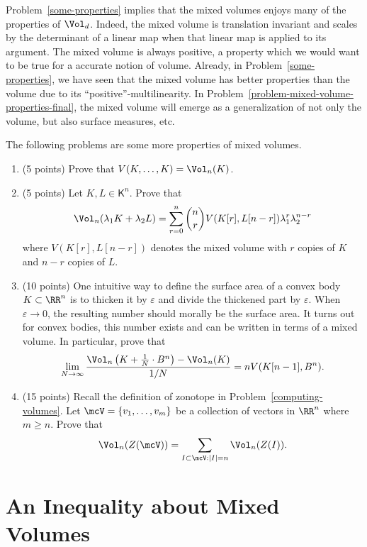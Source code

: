 \documentclass[11pt]{article}
\begin{document}
Problem~\ref{some-properties} implies that the mixed volumes enjoys many of the properties of $\Vol_d$. Indeed, the mixed volume is translation invariant and scales by the determinant of a linear map when that linear map is applied to its argument. The mixed volume is always positive, a property which we would want to be true for a accurate notion of volume. Already, in Problem~\ref{some-properties}, we have seen that the mixed volume has better properties than the volume due to its ``positive''-multilinearity. In Problem~\ref{problem-mixed-volume-properties-final}, the mixed volume will emerge as a generalization of not only the volume, but also surface measures, etc. 
\begin{prob} [35 points] \label{problem-mixed-volume-properties-final}
    The following problems are some more properties of mixed volumes. 
    \begin{enumerate}[label = (\alph*)]
        \item (5 points) Prove that $V(K, \ldots, K) = \Vol_n(K)$. 
        \item (5 points) Let $K, L \in \mathsf{K}^n$. Prove that 
        \[
            \Vol_n(\lambda_1 K + \lambda_2 L) = \sum_{r = 0}^n \binom{n}{r} V(K[r], L[n-r]) \lambda_1^r \lambda_2^{n-r}    
        \]
        where $V(K[r], L[n-r])$ denotes the mixed volume with $r$ copies of $K$ and $n-r$ copies of $L$. 
        \item (10 points) One intuitive way to define the surface area of a convex body $K \subset \RR^n$ is to thicken it by $\varepsilon$ and divide the thickened part by $\varepsilon$. When $\varepsilon \to 0$, the resulting number should morally be the surface area. It turns out for convex bodies, this number exists and can be written in terms of a mixed volume. In particular, prove that  
        \[
            \lim_{N \to \infty} \frac{\Vol_n \left (K + \frac{1}{N} \cdot B^n \right ) - \Vol_n(K)}{1/N} = n V(K[n-1], B^n).
        \]
        \item (15 points) Recall the definition of zonotope in Problem~\ref{computing-volumes}. Let $\mcV = \{v_1, \ldots, v_m\}$ be a collection of vectors in $\RR^n$ where $m \geq n$. Prove that 
        \[
            \Vol_n(Z(\mcV)) = \sum_{I \subset \mcV : |I| = n} \Vol_n(Z(I)).
        \] 
    \end{enumerate}
\end{prob}

\newpage 

\section{An Inequality about Mixed Volumes}
\end{document}

